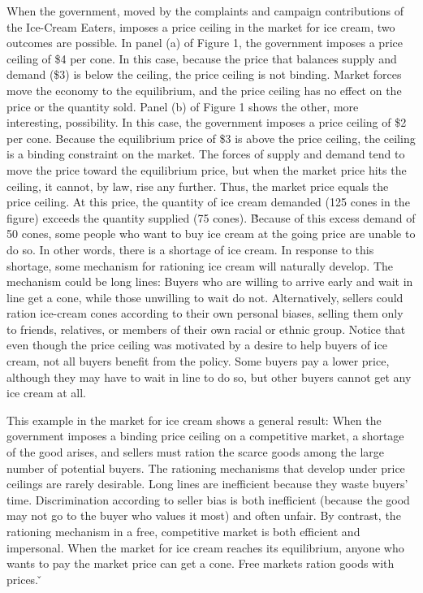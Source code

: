 When the government, moved by the complaints and campaign contributions of the Ice-Cream Eaters, imposes a price
ceiling in the market for ice cream, two outcomes are possible. In panel (a) of Figure 1, the government imposes a
price ceiling of \$4 per cone. In this case, because the price that balances supply and demand (\$3) is below the
ceiling, the price ceiling is not binding. Market forces move the economy to the equilibrium, and the price ceiling
has no effect on the price or the quantity sold. Panel (b) of Figure 1 shows the other, more interesting, possibility.
In this case, the government imposes a price ceiling of \$2 per cone. Because the equilibrium price of \$3 is above
the price ceiling, the ceiling is a binding constraint on the market. The forces of supply and demand tend to move
the price toward the equilibrium price, but when the market price hits the ceiling, it cannot, by law, rise any
further. Thus, the market price equals the price ceiling. At this price, the quantity of ice cream demanded (125
cones in the figure) exceeds the quantity supplied (75 cones). \v

Because of this excess demand of 50 cones, some people who want to buy ice cream at the going price are unable to do
so. In other words, there is a shortage of ice cream. In response to this shortage, some mechanism for rationing ice
cream will naturally develop. The mechanism could be long lines: Buyers who are willing to arrive early and wait in
line get a cone, while those unwilling to wait do not. Alternatively, sellers could ration ice-cream cones according
to their own personal biases, selling them only to friends, relatives, or members of their own racial or ethnic group.
Notice that even though the price ceiling was motivated by a desire to help buyers of ice cream, not all buyers
benefit from the policy. Some buyers pay a lower price, although they may have to wait in line to do so, but other
buyers cannot get any ice cream at all.


This example in the market for ice cream shows a general result: When the government imposes a binding price ceiling
on a competitive market, a shortage of the good arises, and sellers must ration the scarce goods among the large
number of potential buyers. The rationing mechanisms that develop under price ceilings are rarely desirable. Long
lines are inefficient because they waste buyers' time. Discrimination according to seller bias is both inefficient
(because the good may not go to the buyer who values it most) and often unfair. By contrast, the rationing mechanism
in a free, competitive market is both efficient and impersonal. When the market for ice cream reaches its
equilibrium, anyone who wants to pay the market price can get a cone. Free markets ration goods with prices. \v

